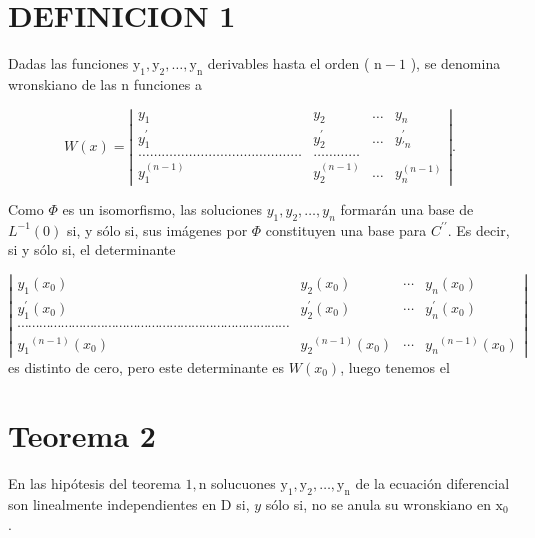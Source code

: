 \documentclass[10pt]{article}
\theoremstyle{plain}
\theoremstyle{definition}
\theoremstyle{remark}
\begin{document}
\section*{DEFINICION 1}
Dadas las funciones $\mathrm{y}_{1}, \mathrm{y}_{2}, \ldots, \mathrm{y}_{\mathrm{n}}$ derivables hasta el orden ( $\mathrm{n}-1$ ), se denomina wronskiano de las n funciones a

$$
W(x)=\left|\begin{array}{cccc}
y_{1} & y_{2} & \ldots & y_{n} \\
y_{1}^{\prime} & y_{2}^{\prime} & \ldots & y_{\prime n}^{\prime} \\
\ldots \ldots \ldots \ldots \ldots \ldots \ldots \ldots \ldots \ldots \ldots \ldots \ldots \ldots & \ldots \ldots \ldots \ldots \\
y_{1}^{(n-1)} & y_{2}^{(n-1)} & \ldots & y_{n}^{(n-1)}
\end{array}\right| .
$$

Como $\Phi$ es un isomorfismo, las soluciones $y_{1}, y_{2}, \ldots, y_{n}$ formarán una base de $L^{-1}(0)$ si, y sólo si, sus imágenes por $\Phi$ constituyen una base para $C^{\prime \prime}$. Es decir, si y sólo si, el determinante

$\left|\begin{array}{cccc}y_{1}\left(x_{0}\right) & y_{2}\left(x_{0}\right) & \cdots & y_{n}\left(x_{0}\right) \\ y_{1}^{\prime}\left(x_{0}\right) & y_{2}^{\prime}\left(x_{0}\right) & \cdots & y_{n}^{\prime}\left(x_{0}\right) \\ \cdots \cdots \cdots \cdots \cdots \cdots \cdots \cdots \cdots \cdots \cdots \cdots \cdots \cdots \cdots \cdots \cdots \cdots \cdots \cdots \cdots \cdots \cdots \cdots \cdots & \\ y_{1}{ }^{(n-1)}\left(x_{0}\right) & y_{2}{ }^{(n-1)}\left(x_{0}\right) & \cdots & y_{n}{ }^{(n-1)}\left(x_{0}\right)\end{array}\right|$\\
es distinto de cero, pero este determinante es $W\left(x_{0}\right)$, luego tenemos el

\section*{Teorema 2}
En las hipótesis del teorema $1, \mathrm{n}$ solucuones $\mathrm{y}_{1}, \mathrm{y}_{2}, \ldots, \mathrm{y}_{\mathrm{n}}$ de la ecuación diferencial son linealmente independientes en D si, $y$ sólo si, no se anula su wronskiano en $\mathrm{x}_0$.
\end{document}
